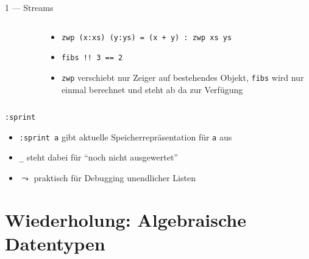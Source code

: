 \documentclass{beamer}
\begin{document}
\begin{frame}{1 --- Streams}
{\begin{columns}
\begin{column}{0.6\textwidth}
\begin{figure}
                \end{figure}
            \end{column}
            \begin{column}{0.4\textwidth}
                \footnotesize
                \begin{itemize}
                    \item \texttt{zwp (x:xs) (y:ys) = (x + y) : zwp xs ys}
                    \item \texttt{fibs !! 3 == 2}
                    \item \texttt{zwp} verschiebt nur Zeiger auf bestehendes Objekt, \texttt{fibs} wird nur einmal berechnet und steht ab da zur Verfügung
                \end{itemize}
            \end{column}
        \end{columns}
    }
\end{frame}

\begin{frame}{\texttt{:sprint}}

	\begin{itemize}
		\item \texttt{:sprint a} gibt aktuelle Speicherrepräsentation für \texttt{a} aus
		\item \texttt{\_} steht dabei für \enquote{noch nicht ausgewertet}
		\item $\leadsto$ praktisch für Debugging unendlicher Listen
	\end{itemize}
\end{frame}

\section{Wiederholung: Algebraische Datentypen}
\end{document}
